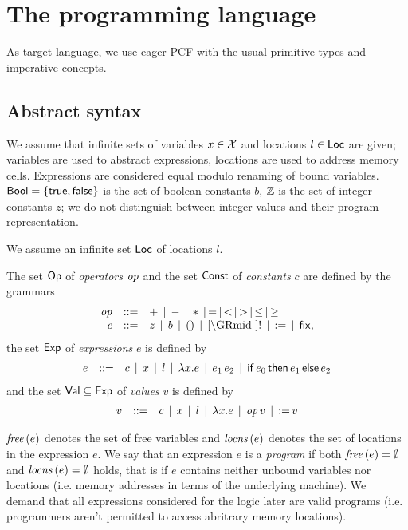 \documentclass[12pt,a4paper]{report}
\begin{document}

\chapter{The programming language}

As target language, we use eager PCF with the usual primitive types and imperative concepts.



\section{Abstract syntax}

We assume that infinite sets of variables $x \in \mathcal{X}$ and locations $l \in \mathsf{Loc}$ are given;
variables are used to abstract expressions, locations are used to address memory cells.
Expressions are considered equal modulo renaming of bound variables.
$\mathsf{Bool}=\{\mathsf{true},\mathsf{false}\}$ is the set of boolean constants $b$, $\mathbb Z$ is the set of integer
constants $z$; we do not distinguish between integer values and their program representation.

We assume an infinite set $\mathsf{Loc}$ of locations $l$.

\begin{definition}[Expressions]
  The set $\mathsf{Op}$ of {\em operators} $\mathit{op}$ and the set $\mathsf{Const}$ of {\em constants} $c$
  are defined by the grammars
  \[\GRbeg
    \op \GRis + \GRmid - \GRmid * \GRmid = \GRmid < \GRmid > \GRmid \le \GRmid \ge \\
    c \GRis z \GRmid b \GRmid \unit \GRmid \cref \GRmid !
             \GRmid \assign \GRmid \fix,
  \GRend\]
  the set $\mathsf{Exp}$ of {\em expressions} $e$ is defined by
  \[\begin{array}{rrlll}
    e & ::= & c \,\mid\, x \,\mid\, l \,\mid\, \lambda x.e \,\mid\, e_1\,e_2
           \,\mid\, \mathsf{if}\,e_0\,\mathsf{then}\,e_1\,\mathsf{else}\,e_2
  \end{array}\]
  and the set $\mathsf{Val} \subseteq \mathsf{Exp}$ of {\em values} $v$ is defined by
  \[\begin{array}{rrlll}
    v & ::= & c \,\mid\, x \,\mid\, l \,\mid\, \lambda x.e \,\mid\, \mathit{op}\,v \,\mid\, \mathsf{:=}\,v
  \end{array}\]
\end{definition}

$\mathit{free}\,(e)$ denotes the set of free variables and $\mathit{locns}\,(e)$ denotes the set of locations in the
expression $e$. We say that an expression $e$ is a {\em program} if both $\mathit{free}\,(e)=\emptyset$
and $\mathit{locns}\,(e)=\emptyset$ holds, that is if $e$ contains neither unbound variables nor
locations (i.e. memory addresses in terms of the underlying machine). We demand that all expressions
considered for the logic later are valid programs (i.e. programmers aren't permitted to access
abritrary memory locations).
\end{document}
